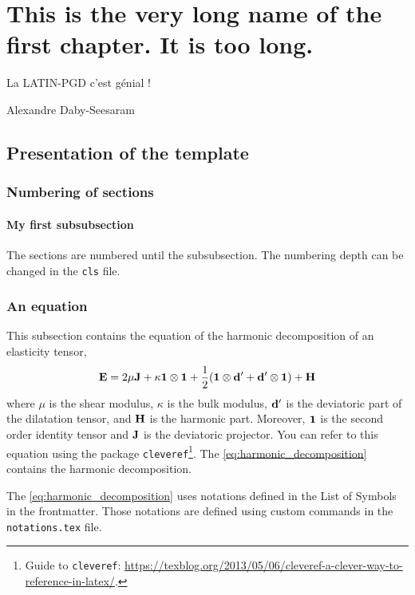 \chapter[Short name of chapter]{This is the very long name of the first chapter. It is too long.}

{\color{Azul1FCQ} \epigraph{La LATIN-PGD c'est génial !}{Alexandre Daby-Seesaram}}



\section{Presentation of the template}%
\label{sec:presentation_of_the_template}

\subsection{Numbering of sections}
\label{sub:numbering_of_sections}

\subsubsection{My first subsubsection}
\label{ssub:my_first_subsubsection}

The sections are numbered until the subsubsection.
The numbering depth can be changed in the \texttt{cls} file.

\subsection{An equation}%
\label{sub:an_equation}

This subsection contains the equation of the harmonic decomposition of an elasticity tensor,
\begin{equation}\label{eq:harmonic_decomposition}
    \ela =
        2 \mu \J +
        \kappa \id{2} \otimes \id{2} +
        \frac{1}{2} (\id{2} \otimes \dev{\dil} + \dev{\dil} \otimes \id{2}) +
        \har
\end{equation}
where
    $\mu$ is the shear modulus,
    $\kappa$ is the bulk modulus,
    $\mathbf{d}'$ is the deviatoric part of the dilatation tensor, and
    $\mathbf{H}$ is the harmonic part.
Moreover, $\id{2}$ is the second order identity tensor and $\mathbf{J}$ is the deviatoric projector.
You can refer to this equation using the package \texttt{cleveref}\footnote{Guide to \texttt{cleveref}: \url{https://texblog.org/2013/05/06/cleveref-a-clever-way-to-reference-in-latex/}.}.
The \cref{eq:harmonic_decomposition} contains the harmonic decomposition.
\begin{remark}
    The \cref{eq:harmonic_decomposition} uses notations defined in the List of Symbols in the frontmatter.
    Those notations are defined using custom commands in the \texttt{notations.tex} file.
\end{remark}


